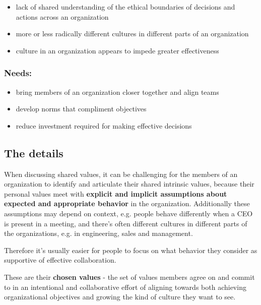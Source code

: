 \begin{itemize}
\item lack of shared understanding of the ethical boundaries of decisions and actions across an organization

\item more or less radically different cultures in different parts of an organization

\item culture in an organization appears to impede greater effectiveness

\end{itemize}

\subsubsection{Needs:}
\label{needs:}

\begin{itemize}
\item bring members of an organization closer together and align teams

\item develop norms that compliment objectives

\item reduce investment required for making effective decisions

\end{itemize}

\subsection{The details}
\label{thedetails}

When discussing shared values, it can be challenging for the members of an organization to identify and articulate their shared intrinsic values, because their personal values meet with \textbf{explicit and implicit assumptions about expected and appropriate behavior} in the organization. Additionally these assumptions may depend on context, e.g. people behave differently when a CEO is present in a meeting, and there's often different cultures in different parts of the organizations, e.g. in engineering, sales and management.

Therefore it's usually easier for people to focus on what behavior they consider as supportive of effective collaboration.

These are their \textbf{chosen values} - the set of values members agree on and commit to in an intentional and collaborative effort of aligning towards both achieving organizational objectives and growing the kind of culture they want to see.

